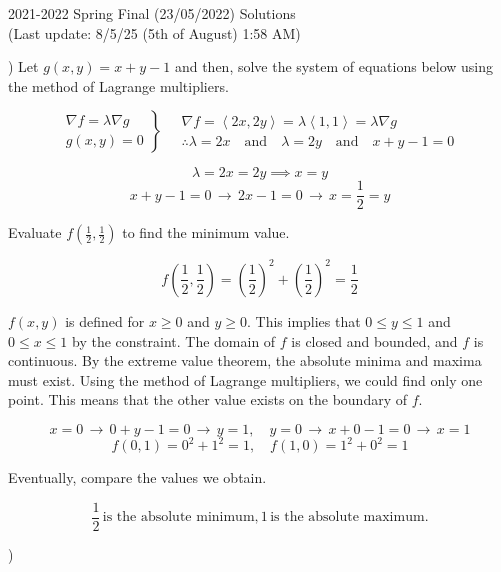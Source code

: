 \documentclass{article}
\begin{document}
\newpage

\begin{center}
2021-2022 Spring Final (23/05/2022) Solutions\\
(Last update: 8/5/25 (5th of August) 1:58 AM)
\end{center}

) Let $g(x,y)=x+y-1$ and then, solve the system of equations below using the method of Lagrange multipliers.

\[
\left.
\begin{array}{ll}
\displaystyle\nabla f =\lambda \nabla g \\
\displaystyle g(x,y) = 0
\end{array}
\right\}\quad
\begin{array}{ll}
\nabla f = \left\langle 2x, 2y\right\rangle = \lambda\left\langle1,1\right\rangle = \lambda\nabla g\\\therefore\displaystyle \lambda = 2x\quad \text{and}\quad \lambda = 2y\quad \text{and}\quad x+y-1=0
\end{array}
\]

\[\lambda=2x=2y\implies x=y\]
\[x+y-1=0 \,\rightarrow\, 2x-1 = 0\,\rightarrow\,x=\frac12=y\]

\hfill

\noindent Evaluate $\displaystyle f\left(\frac12,\frac12\right)$ to find the minimum value.

\[f\left(\frac12,\frac12\right)=\left(\frac12\right)^2+\left(\frac12\right)^2=\frac12\]

\hfill

\noindent $f(x,y)$ is defined for $x\geq0$ and $y\geq0$. This implies that $0\leq y \leq1$ and $0\leq x\leq1$ by the constraint. The domain of $f$ is closed and bounded, and $f$ is continuous. By the extreme value theorem, the absolute minima and maxima must exist. Using the method of Lagrange multipliers, we could find only one point. This means that the other value exists on the boundary of $f$.

\[x=0\,\rightarrow\,0+y-1=0\,\rightarrow\,y=1,\quad y=0\,\rightarrow\, x+0-1=0\,\rightarrow\, x=1\]
\[f(0,1) = 0^2 +1^2 = 1,\quad f(1,0) = 1^2+0^2 = 1\]

\hfill

\noindent Eventually, compare the values we obtain.

\[\boxed{\frac12\,\text{is the absolute minimum}, 1\,\text{is the absolute maximum}.}\]

\hfill

)
\end{document}
